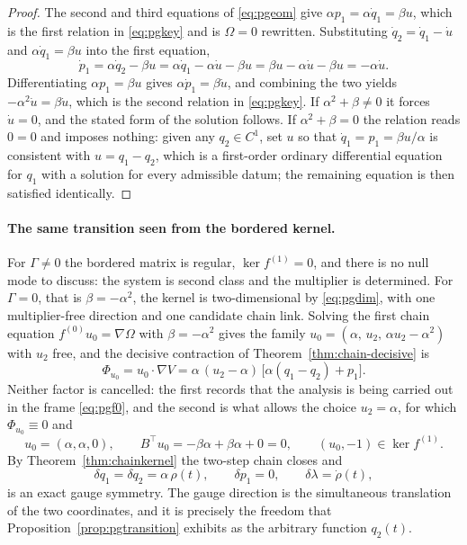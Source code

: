 \documentclass[12pt]{article}
\theoremstyle{plain}
\theoremstyle{definition}
\theoremstyle{remark}
\newcommand{\Om}{\Omega}
\begin{document}
	\begin{proof}
		The second and third equations of \eqref{eq:pgeom} give
		$\alpha p_{1}=\alpha\dot q_{1}=\beta u$, which is the first relation in
		\eqref{eq:pgkey} and is $\Om=0$ rewritten. Substituting
		$\dot q_{2}=\dot q_{1}-\dot u$ and $\alpha\dot q_{1}=\beta u$ into the first
		equation,
		\[
		\dot p_{1}=\alpha\dot q_{2}-\beta u
		=\alpha\dot q_{1}-\alpha\dot u-\beta u
		=\beta u-\alpha\dot u-\beta u
		=-\alpha\dot u .
		\]
		Differentiating $\alpha p_{1}=\beta u$ gives $\alpha\dot p_{1}=\beta\dot u$,
		and combining the two yields $-\alpha^{2}\dot u=\beta\dot u$, which is the
		second relation in \eqref{eq:pgkey}. If $\alpha^{2}+\beta\neq0$ it forces
		$\dot u=0$, and the stated form of the solution follows. If
		$\alpha^{2}+\beta=0$ the relation reads $0=0$ and imposes nothing: given any
		$q_{2}\in C^{1}$, set $u$ so that $\dot q_{1}=p_{1}=\beta u/\alpha$ is
		consistent with $u=q_{1}-q_{2}$, which is a first-order ordinary
		differential equation for $q_{1}$ with a solution for every admissible
		datum; the remaining equation is then satisfied identically.
	\end{proof}
	
	\paragraph{The same transition seen from the bordered kernel.} For
	$\Gamma\neq0$ the bordered matrix is regular, $\ker f^{(1)}=0$, and there is no
	null mode to discuss: the system is second class and the multiplier is
	determined. For $\Gamma=0$, that is $\beta=-\alpha^{2}$, the kernel is
	two-dimensional by \eqref{eq:pgdim}, with one multiplier-free direction and one
	candidate chain link. Solving the first chain equation
	$f^{(0)}u_{0}=\nabla\Om$ with $\beta=-\alpha^{2}$ gives the family
	$u_{0}=(\alpha,\,u_{2},\,\alpha u_{2}-\alpha^{2})$ with $u_{2}$ free, and the
	decisive contraction of Theorem~\ref{thm:chain-decisive} is
	\begin{equation}
		\Phi_{u_{0}}=u_{0}\!\cdot\!\nabla V
		=\alpha\,(u_{2}-\alpha)\,\bigl[\alpha(q_{1}-q_{2})+p_{1}\bigr].
		\label{eq:pgPhi}
	\end{equation}
	Neither factor is cancelled: the first records that the analysis is being
	carried out in the frame \eqref{eq:pgf0}, and the second is what allows the
	choice $u_{2}=\alpha$, for which $\Phi_{u_{0}}\equiv0$ and
	\begin{equation}
		u_{0}=(\alpha,\alpha,0),
		\qquad
		B^{\top}u_{0}=-\beta\alpha+\beta\alpha+0=0,
		\qquad
		(u_{0},-1)\in\ker f^{(1)} .
		\label{eq:pgu0}
	\end{equation}
	By Theorem~\ref{thm:chainkernel} the two-step chain closes and
	\begin{equation}
		\delta q_{1}=\delta q_{2}=\alpha\,\rho(t),
		\qquad
		\delta p_{1}=0,
		\qquad
		\delta\lambda=\dot\rho(t),
		\label{eq:pggauge}
	\end{equation}
	is an exact gauge symmetry. The gauge direction is the simultaneous translation
	of the two coordinates, and it is precisely the freedom that
	Proposition~\ref{prop:pgtransition} exhibits as the arbitrary function
	$q_{2}(t)$.
	
\end{document}
